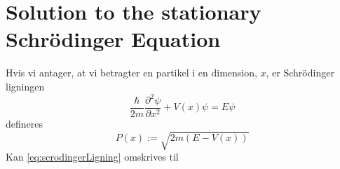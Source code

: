 \section{Solution to the stationary Schrödinger Equation}
Hvis vi antager, at vi betragter en partikel i en dimension, $x$,  er Schrödinger ligningen
\begin{equation}
    \frac{\hbar}{2m}\frac{\partial^2 \psi}{\partial x^2} + V(x) \psi = E \psi
    \label{eq:scrodingerLigning}
\end{equation}
defineres
\begin{equation}
P(x) := \sqrt{2m(E-V(x))}
\end{equation}
Kan \cref{eq:scrodingerLigning} omskrives til
